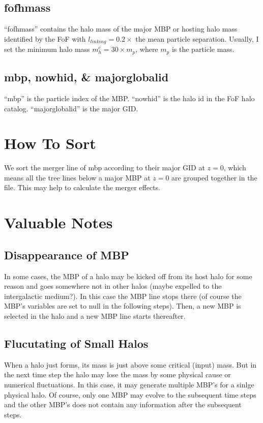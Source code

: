 \documentclass[openleft]{memoir}
\begin{document}
\subsection{fofhmass}
``fofhmass'' contains the halo mass of the major MBP or hosting halo mass
identified by the FoF with $l_{ linking} = 0.2\times$ the mean particle separation. Usually, I set the minimum
halo mass $m_{h}^c = 30\times m_p$, where $m_p$ is the particle mass.

\subsection{mbp, nowhid, \& majorglobalid}
``mbp'' is the particle index of the MBP.
``nowhid'' is the halo id in the FoF halo catalog.
``majorglobalid'' is the major GID.

\section{How To Sort}
We sort the merger line of mbp according to their major GID at $z=0$,
which means all the tree lines below a major MBP at $z=0$ are grouped together in the file.
This may help to calculate the merger effects. 

\section{Valuable Notes}
\subsection{Disappearance of MBP}
In some cases, the MBP of a halo may be kicked off from its host halo for some reason and goes somewhere not in other halos
(maybe expelled to the intergalactic medium?). 
In this case the MBP line stops there
(of course the MBP's variables are set to null in the following steps). Then, a new MBP is selected in the halo and a new MBP line 
starts thereafter.
\subsection{Flucutating of Small Halos}
When a halo just forms, its mass is just above some critical (input) mass. But in the next time step the halo may lose the mass
by some physical cause or numerical fluctuations. In this case, it may generate multiple MBP's for a sinlge physical halo.
Of course, only one MBP may evolve to the subsequent time steps and the other MBP's does not contain any information
after the subsequent steps.
\end{document}

